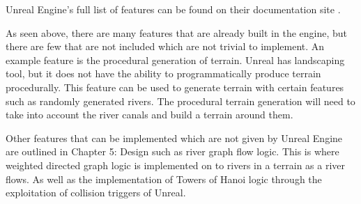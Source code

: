 Unreal Engine's full list of features can be found on their documentation site \cite{unrealfeaturelist}.

As seen above, there are many features that are already built in the engine, but there are few that are not included which are not trivial to implement. An example feature is the procedural generation of terrain. Unreal has landscaping tool, but it does not have the ability to programmatically produce terrain procedurally. This feature can be used to generate terrain with certain features such as randomly generated rivers. The procedural terrain generation will need to take into account the river canals and build a terrain around them.
\newline
\par
Other features that can be implemented which are not given by Unreal Engine are outlined in Chapter 5: Design such as river graph flow logic. This is where weighted directed graph logic is implemented on to rivers in a terrain as a river flows. As well as the implementation of Towers of Hanoi logic through the exploitation of collision triggers of Unreal.
